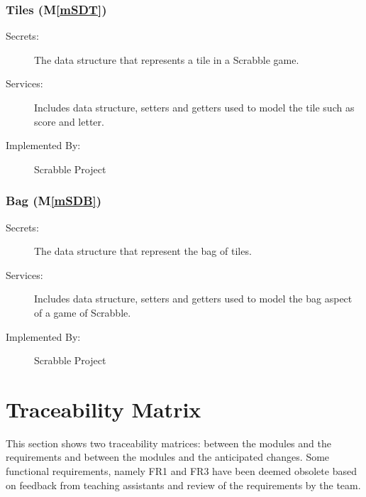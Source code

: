 \documentclass[12pt, titlepage]{article}
\newcommand{\mref}[1]{M\ref{#1}}
\begin{document}
\subsubsection{Tiles (\mref{mSDT})}
\begin{description}
\item[Secrets:] The data structure that represents a tile in a Scrabble game.
\item[Services:] Includes data structure, setters and getters used to model the tile such as score and letter.
\item[Implemented By:] Scrabble Project
\end{description}

\subsubsection{Bag (\mref{mSDB})}
\begin{description}
\item[Secrets:] The data structure that represent the bag of tiles.
\item[Services:] Includes data structure, setters and getters used to model the bag aspect of a game of Scrabble.
\item[Implemented By:] Scrabble Project
\end{description}


\section{Traceability Matrix} \label{SecTM} %

This section shows two traceability matrices: between the modules and the
requirements and between the modules and the anticipated changes. Some functional requirements, namely FR1 and FR3 have been deemed obsolete based on feedback from teaching assistants and review of the requirements by the team.
 
\end{document}
